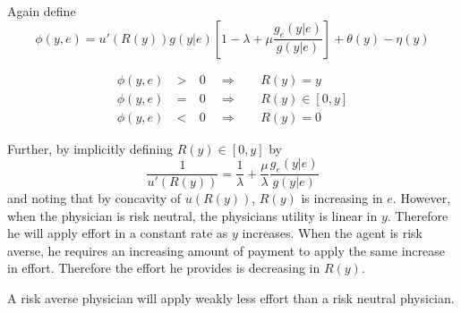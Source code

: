 Again define 
\[
    \phi(y,e) = u'(R(y))g(y|e)\left[1-\lambda+\mu \frac{g_e(y|e)}{g(y|e)}\right]  + \theta(y)-\eta(y)
\]

\begin{subequations}
\label{eq:KT-analysis-ra}
\begin{alignat}{3}
    \phi(y,e) & \: > \: & 0 & \enspace \Rightarrow & & \enspace R(y)=y \label{subeq:large-y-ra}\\
    \phi(y,e) & \: = \: & 0 & \enspace \Rightarrow & & \enspace R(y)\in [0,y] \label{subeq:interval-y-ra} \\
    \phi(y,e) & \: < \: & 0 & \enspace \Rightarrow & & \enspace R(y) =0 \label{subeq:small-y-ra}
\end{alignat}
\end{subequations}

Further, by implicitly defining $R(y)\in[0,y]$ by 
\[
    \frac{1}{u'(R(y))}=\frac{1}{\lambda}+\frac{\mu}{\lambda}\frac{g_e(y|e)}{g(y|e)}
\]
and noting that by concavity of $u(R(y))$, $R(y)$ is increasing in $e$. However, when the physician is risk neutral, the physicians utility is linear in $y$. Therefore he will apply effort in a constant rate as $y$ increases. When the agent is risk averse, he requires an increasing amount of payment to apply the same increase in effort. Therefore the effort he provides is decreasing in $R(y)$.


\begin{proposition}
A risk averse physician will apply weakly less effort than a risk neutral physician. 
\end{proposition}
\printbibliography%
\listoftodos%
